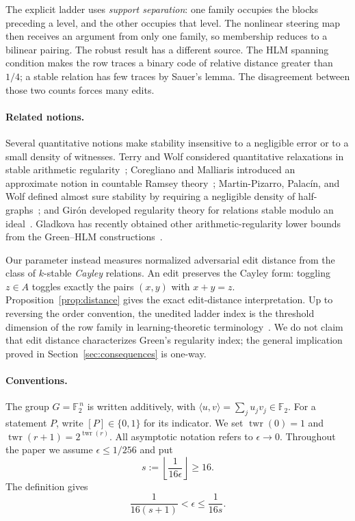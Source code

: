 \documentclass[11pt]{article}
\theoremstyle{plain}
\theoremstyle{definition}
\numberwithin{theorem}{section}
\newcommand{\F}{\mathbb{F}}
\newcommand{\inner}[2]{\langle #1,#2\rangle}
\newcommand{\twr}{\operatorname{twr}}
\begin{document}
The explicit ladder uses \emph{support separation}: one family occupies the
blocks preceding a level, and the other occupies that level.  The nonlinear
steering map then receives an argument from only one family, so membership
reduces to a bilinear pairing.  The robust result has a different source.
The HLM spanning condition makes the row traces a binary code of relative
distance greater than $1/4$; a stable relation has few traces by Sauer's
lemma.  The disagreement between those two counts forces many edits.

\paragraph{Related notions.}
Several quantitative notions make stability insensitive to a negligible
error or to a small density of witnesses.  Terry and Wolf considered
quantitative relaxations in stable arithmetic regularity~\cite[\S5]{TW};
Coregliano and Malliaris introduced an approximate notion in countable
Ramsey theory~\cite[Definition~3.5]{CM}; Martin-Pizarro, Palac\'in, and Wolf
defined almost sure stability by requiring a negligible density of
half-graphs~\cite{MPPW}; and Gir\'on developed regularity theory for
relations stable modulo an ideal~\cite{Giron}.  Gladkova has recently
obtained other arithmetic-regularity lower bounds from the Green--HLM
constructions~\cite{Gladkova}.

Our parameter instead measures normalized adversarial edit distance from
the class of $k$-stable \emph{Cayley} relations.  An edit preserves the
Cayley form: toggling $z\in A$ toggles exactly the pairs $(x,y)$ with
$x+y=z$.  Proposition~\ref{prop:distance} gives the exact edit-distance
interpretation.  Up to reversing the order convention, the unedited
ladder index is the threshold dimension of the row family in
learning-theoretic terminology~\cite{GGKM}.  We do not claim that edit
distance characterizes Green's regularity index; the general implication
proved in Section~\ref{sec:consequences} is one-way.

\paragraph{Conventions.}
The group $G=\F_2^{\,n}$ is written additively, with
$\inner{u}{v}=\sum_j u_jv_j\in\F_2$.  For a statement $P$, write
$[P]\in\{0,1\}$ for its indicator.  We set $\twr(0)=1$ and
$\twr(r+1)=2^{\twr(r)}$.  All asymptotic notation refers to
$\epsilon\to0$.  Throughout the paper we assume $\epsilon\le1/256$ and put
\[
  s:=\left\lfloor\frac1{16\epsilon}\right\rfloor\ge16.
\]
The definition gives
\begin{equation}\label{eq:epsilon-s}
  \frac1{16(s+1)}<\epsilon\le\frac1{16s}.
\end{equation}
\end{document}

